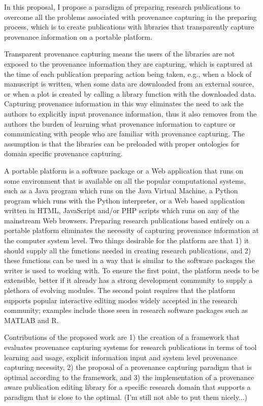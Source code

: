 In this proposal, I propose a paradigm of preparing research publications to overcome all the problems associated with provenance capturing in the preparing process, which is to create publications with libraries that transparently capture provenance information on a portable platform.

Transparent provenance capturing means the users of the libraries are not exposed to the provenance information they are capturing, which is captured at the time of each publication preparing action being taken, e.g., when a block of manuscript is written, when some data are downloaded from an external source, or when a plot is created by calling a library function with the downloaded data. Capturing provenance information in this way eliminates the need to ask the authors to explicitly input provenance information, thus it also removes from the authors the burden of learning what provenance information to capture or communicating with people who are familiar with provenance capturing. The assumption is that the libraries can be preloaded with proper ontologies for domain specific provenance capturing.

A portable platform is a software package or a Web application that runs on some environment that is available on all the popular computational systems, such as a Java program which runs on the Java Virtual Machine, a Python program which runs with the Python interpreter, or a Web based application written in HTML, JavaScript and/or PHP scripts which runs on any of the mainstream Web browsers. Preparing research publications based entirely on a portable platform eliminates the necessity of capturing provenance information at the computer system level. Two things desirable for the platform are that 1) it should supply all the functions needed in creating research publications, and 2) these functions can be used in a way that is similar to the software packages the writer is used to working with. To ensure the first point, the platform needs to be extensible, better if it already has a strong development community to supply a plethora of evolving modules. The second point requires that the platform supports popular interactive editing modes widely accepted in the research community; examples include those seen in research software packages such as MATLAB and R.

Contributions of the proposed work are 1) the creation of a framework that evaluates provenance capturing systems for research publications in terms of tool learning and usage, explicit information input and system level provenance capturing necessity, 2) the proposal of a provenance capturing paradigm that is optimal according to the framework, and 3) the implementation of a provenance aware publication editing library for a specific research domain that supports a paradigm that is close to the optimal. (I'm still not able to put them nicely...)

